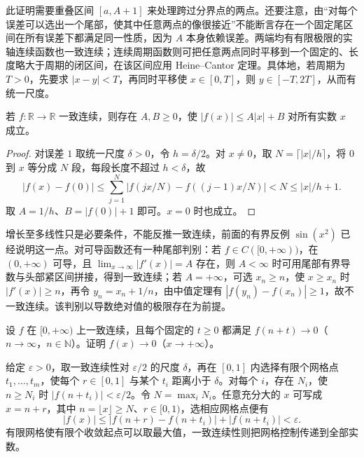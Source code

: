 此证明需要重叠区间 $[a,A+1]$ 来处理跨过分界点的两点。还要注意，由“对每个误差可以选出一个尾部，使其中任意两点的像很接近”不能断言存在一个固定尾区间在所有误差下都满足同一性质，因为 $A$ 本身依赖误差。两端均有有限极限的实轴连续函数也一致连续；连续周期函数则可把任意两点同时平移到一个固定的、长度略大于周期的闭区间，在该区间应用 Heine--Cantor 定理。具体地，若周期为 $T>0$，先要求 $|x-y|<T$，再同时平移使 $x\in[0,T]$，则 $y\in[-T,2T]$，从而有统一尺度。

\begin{proposition}
\label{prop:pei-uniform-linear-growth}
若 $f:\mathbb R\to\mathbb R$ 一致连续，则存在 $A,B\ge0$，使 $|f(x)|\le A|x|+B$ 对所有实数 $x$ 成立。
\end{proposition}

\begin{proof}
对误差 $1$ 取统一尺度 $\delta>0$，令 $h=\delta/2$。对 $x\ne0$，取 $N=\lceil |x|/h\rceil$，将 $0$ 到 $x$ 等分成 $N$ 段，每段长度不超过 $h<\delta$，故
\[
|f(x)-f(0)|\le\sum_{j=1}^N|f(jx/N)-f((j-1)x/N)|<N\le |x|/h+1.
\]
取 $A=1/h$、$B=|f(0)|+1$ 即可。$x=0$ 时也成立。
\end{proof}

增长至多线性只是必要条件，不能反推一致连续，前面的有界反例 $\sin(x^2)$ 已经说明这一点。对可导函数还有一种尾部判别：若 $f\in C([0,+\infty))$，在 $(0,+\infty)$ 可导，且 $\lim_{x\to\infty}|f'(x)|=A$ 存在，则 $A<\infty$ 时可用尾部有界导数与头部紧区间拼接，得到一致连续；若 $A=+\infty$，可选 $x_n\ge n$，使 $x\ge x_n$ 时 $|f'(x)|\ge n$，再令 $y_n=x_n+1/n$，由中值定理有 $|f(y_n)-f(x_n)|\ge1$，故不一致连续。该判别以导数绝对值的极限存在为前提。

\begin{example}
设 $f$ 在 $[0,+\infty)$ 上一致连续，且每个固定的 $t\ge0$ 都满足 $f(n+t)\to0$（$n\to\infty$，$n\in\mathbb N$）。证明 $f(x)\to0$（$x\to+\infty$）。
\end{example}

\begin{solve}
给定 $\varepsilon>0$，取一致连续性对 $\varepsilon/2$ 的尺度 $\delta$，再在 $[0,1]$ 内选择有限个网格点 $t_1,\ldots,t_m$，使每个 $r\in[0,1]$ 与某个 $t_i$ 距离小于 $\delta$。对每个 $i$，存在 $N_i$，使 $n\ge N_i$ 时 $|f(n+t_i)|<\varepsilon/2$。令 $N=\max_iN_i$。任意充分大的 $x$ 可写成 $x=n+r$，其中 $n=\lfloor x\rfloor\ge N$、$r\in[0,1)$，选相应网格点便有
\[
|f(x)|\le|f(n+r)-f(n+t_i)|+|f(n+t_i)|<\varepsilon.
\]
有限网格使有限个收敛起点可以取最大值，一致连续性则把网格控制传递到全部实数。
\end{solve}

